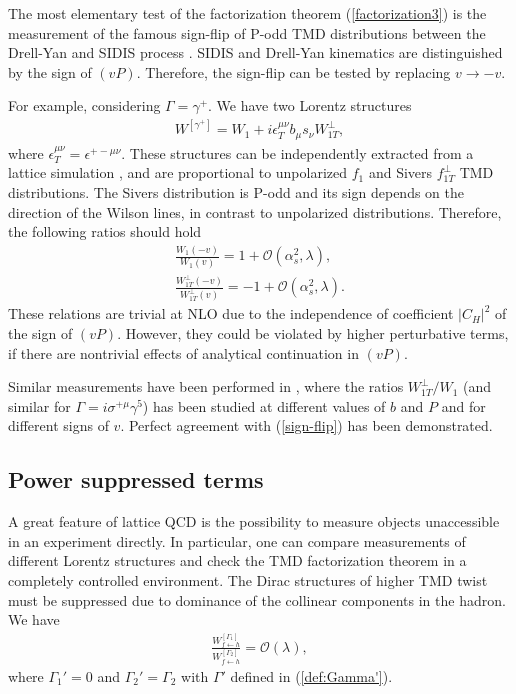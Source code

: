 \documentclass[a4paper, amsfonts, amssymb, amsmath, reprint, showkeys, nofootinbib, twoside]{revtex4-1}
\newcommand{\nn}{\nonumber}
\newcommand{\ot}{\leftarrow}
\renewcommand{\(}{\left(}
\renewcommand{\)}{\right)}
\renewcommand{\[}{\left[}
\renewcommand{\]}{\right]}
\begin{document}
The most elementary test of the factorization theorem (\ref{factorization3}) is the measurement of the famous sign-flip of P-odd TMD distributions between the Drell-Yan and SIDIS process \cite{Collins:2002kn}. SIDIS and Drell-Yan kinematics are distinguished  by the sign of $(vP)$. Therefore, the sign-flip can be tested by replacing $v\to-v$.

For example, considering $\Gamma=\gamma^+$. We have two Lorentz structures
\begin{eqnarray}
W^{[\gamma^+]}=W_1+i\epsilon_T^{\mu\nu}b_\mu s_\nu W_{1T}^\perp,
\end{eqnarray}
where $\epsilon_T^{\mu\nu}=\epsilon^{+-\mu\nu}$. These structures can be independently extracted from a lattice simulation \cite{Musch:2011er}, and are proportional to unpolarized $f_1$ and Sivers $f_{1T}^\perp$ TMD distributions. The Sivers distribution is P-odd and its sign depends on the direction of the Wilson lines, in contrast to unpolarized distributions.  Therefore, the following ratios should hold
\begin{eqnarray}\label{sign-flip}
\frac{W_1(-v)}{W_1(v)}=1+\mathcal{O}(\alpha_s^2,\lambda),
\\\nn
\frac{W_{1T}^\perp(-v)}{W_{1T}^\perp(v)}=-1+\mathcal{O}(\alpha_s^2,\lambda).
\end{eqnarray}
These relations are trivial at NLO due to the independence of coefficient $|C_H|^2$ of the sign of $(vP)$. However, they could be violated by higher perturbative terms, if there are nontrivial effects of analytical continuation in $(vP)$.

Similar measurements have been performed in \cite{Musch:2011er,Engelhardt:2015xja}, where the ratios $ W_{1T}^\perp/W_1$ (and similar for $\Gamma=i\sigma^{+\mu}\gamma^5$) has been studied at different values of $b$ and $P$ and for different signs of $v$. Perfect agreement with (\ref{sign-flip}) has been demonstrated.

\subsection{Power suppressed terms}

A great feature of lattice QCD is the possibility to measure objects unaccessible in an experiment directly. In particular, one can compare measurements of different Lorentz structures and check
the TMD factorization theorem in a completely controlled environment. The Dirac structures of higher TMD twist must be suppressed due to dominance of the collinear components in the hadron. We have
\begin{eqnarray}\label{R:suppresed}
\frac{W_{f\ot h}^{[\Gamma_1]}}{W_{f\ot h}^{[\Gamma_2]}}=\mathcal{O}(\lambda),
\end{eqnarray}
where $\Gamma_1'=0$ and $\Gamma_2'=\Gamma_2$ with $\Gamma'$ defined in (\ref{def:Gamma'}).
\end{document}

